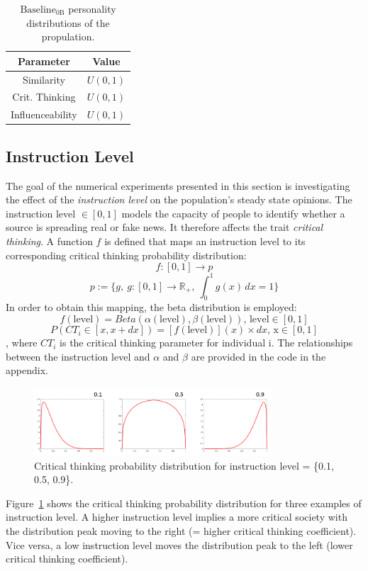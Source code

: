 \begin{table}[h!]
\centering
	\begin{tabular}{||c | c||}
	\hline
	Parameter&Value\\
	\hline
	Similarity&$U(0,1)$\\
	Crit. Thinking&$U(0,1)$\\
	Influenceability&$U(0,1)$\\
	\hline
	\end{tabular}
	\newline
	\caption{$\text{Baseline}_\text{0B}$ personality distributions of the propulation.}
	\label{table:2}
\end{table}
\subsection{Instruction Level}
\label{sec:Instr_Level}
The goal of the numerical experiments presented in this section is investigating the effect of the \emph{instruction level} on the population's steady state opinions. The instruction level $\in [0,1]$ models the capacity of people to identify whether a source is spreading real or fake news. It therefore affects the trait \emph{critical thinking}. A function $f$ is defined that maps an instruction level to its corresponding critical thinking probability distribution:
$$
f: [0,1] \to p 
$$
$$
p:= \{g,\ g: [0,1] \to \mathbb{R}_+,\ \int_{0}^{1} g(x) \,dx = 1\}
$$
In order to obtain this mapping, the beta distribution is employed: 
$$
f(\text{level}) = Beta(\alpha(\text{level}), \beta(\text{level}))\text{, level} \in [0,1]
$$
$$
P(CT_i\in[x,x+dx]) = [f(\text{level})](x)\times dx\text{, x}\in [0,1]
$$
, where $CT_i$ is the critical thinking parameter for individual i. The relationships between the instruction level and $\alpha$ and $\beta$ are provided in the code in the appendix. 
\begin{figure}[!t]
	\centering
	\includegraphics[width=3.5in]{Figures/instruction_level_dist.png}
	\caption{Critical thinking probability distribution for instruction level = \{0.1, 0.5, 0.9\}.}
	\label{pics:critdistribution}
\end{figure}
Figure~\ref{pics:critdistribution} shows the critical thinking probability distribution for three examples of instruction level. A higher instruction level implies a more critical society with the distribution peak moving to the right (= higher critical thinking coefficient). Vice versa, a low instruction level moves the distribution peak to the left (lower critical thinking coefficient). \newline
